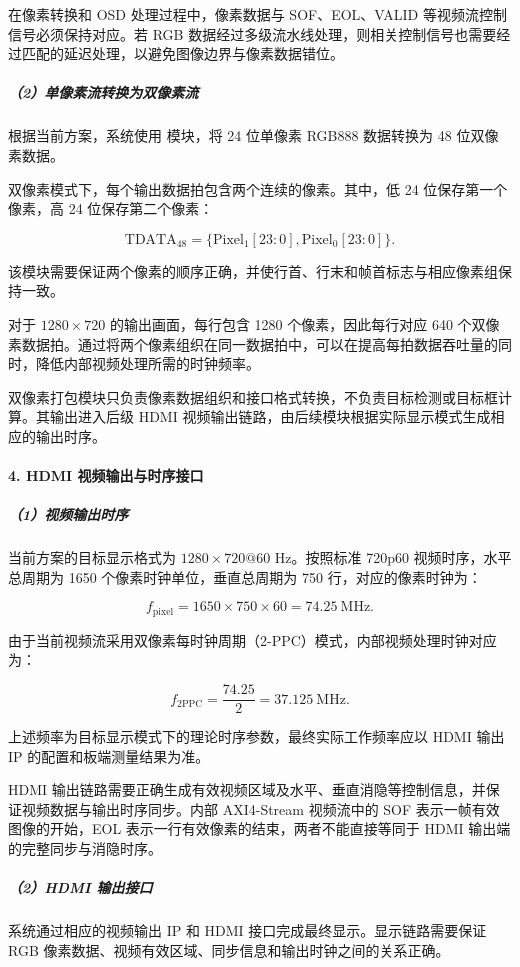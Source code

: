 \documentclass[UTF8,a4paper,12pt,fontset=windows]{ctexart}
\begin{document}
在像素转换和 OSD 处理过程中，像素数据与 SOF、EOL、VALID 等视频流控制信号必须保持对应。若 RGB 数据经过多级流水线处理，则相关控制信号也需要经过匹配的延迟处理，以避免图像边界与像素数据错位。

\subparagraph*{（2）单像素流转换为双像素流}
根据当前方案，系统使用  模块，将 24 位单像素 RGB888 数据转换为 48 位双像素数据。

双像素模式下，每个输出数据拍包含两个连续的像素。其中，低 24 位保存第一个像素，高 24 位保存第二个像素：

\[
\mathrm{TDATA}_{48}
=\{\mathrm{Pixel}_1[23:0],\mathrm{Pixel}_0[23:0]\}.
\]

该模块需要保证两个像素的顺序正确，并使行首、行末和帧首标志与相应像素组保持一致。

对于 \(1280\times720\) 的输出画面，每行包含 1280 个像素，因此每行对应 640 个双像素数据拍。通过将两个像素组织在同一数据拍中，可以在提高每拍数据吞吐量的同时，降低内部视频处理所需的时钟频率。

双像素打包模块只负责像素数据组织和接口格式转换，不负责目标检测或目标框计算。其输出进入后级 HDMI 视频输出链路，由后续模块根据实际显示模式生成相应的输出时序。

\paragraph*{4. HDMI 视频输出与时序接口}
\subparagraph*{（1）视频输出时序}
当前方案的目标显示格式为 \(1280\times720@60\text{ Hz}\)。按照标准 720p60 视频时序，水平总周期为 1650 个像素时钟单位，垂直总周期为 750 行，对应的像素时钟为：

\[
f_{\mathrm{pixel}}
=1650\times750\times60
=74.25\ \text{MHz}.
\]

由于当前视频流采用双像素每时钟周期（2-PPC）模式，内部视频处理时钟对应为：

\[
f_{\mathrm{2PPC}}
=\frac{74.25}{2}
=37.125\ \text{MHz}.
\]

上述频率为目标显示模式下的理论时序参数，最终实际工作频率应以 HDMI 输出 IP 的配置和板端测量结果为准。

HDMI 输出链路需要正确生成有效视频区域及水平、垂直消隐等控制信息，并保证视频数据与输出时序同步。内部 AXI4-Stream 视频流中的 SOF 表示一帧有效图像的开始，EOL 表示一行有效像素的结束，两者不能直接等同于 HDMI 输出端的完整同步与消隐时序。

\subparagraph*{（2）HDMI 输出接口}
系统通过相应的视频输出 IP 和 HDMI 接口完成最终显示。显示链路需要保证 RGB 像素数据、视频有效区域、同步信息和输出时钟之间的关系正确。
\end{document}
